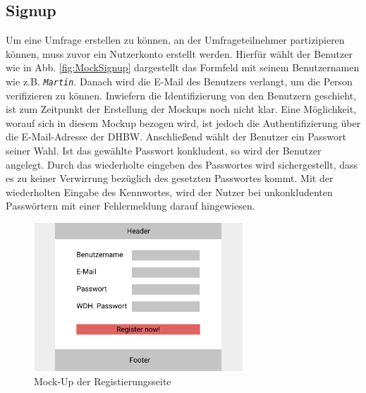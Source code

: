 \subsection{Signup}
\label{ssec:konzept:client:signup}
Um eine Umfrage erstellen zu können, an der Umfrageteilnehmer partizipieren können, muss zuvor ein Nutzerkonto erstellt werden. 
Hierfür wählt der Benutzer wie in Abb. \ref{fig:MockSignup} dargestellt das Formfeld mit seinem Benutzernamen wie z.B. \emph{\texttt{Martin}}. 
Danach wird die E-Mail des Benutzers verlangt, um die Person verifizieren zu können. 
Inwiefern die Identifizierung von den Benutzern geschieht, ist zum Zeitpunkt der Erstellung der Mockups noch nicht klar. 
Eine Möglichkeit, worauf sich in diesem Mockup bezogen wird, ist jedoch die Authentifizierung über die E-Mail-Adresse der DHBW. 
Anschließend wählt der Benutzer ein Passwort seiner Wahl. 
Ist das gewählte Passwort konkludent, so wird der Benutzer angelegt.
Durch das wiederholte eingeben des Passwortes wird sichergestellt, dass es zu keiner Verwirrung bezüglich des gesetzten Passwortes kommt. 
Mit der wiederholten Eingabe des Kennwortes, wird der Nutzer bei unkonkludenten Passwörtern mit einer Fehlermeldung darauf hingewiesen.

\begin{figure}[H]
	\centering
	\includegraphics[width=0.7\textwidth]{img/konzeption/client/register}
	\captionsetup{justification=centering, format=plain}
	\caption[Mock-Up der Startseite]{Mock-Up der Registierungsseite \\\figma}
	\label{fig:MockRegister}
\end{figure}